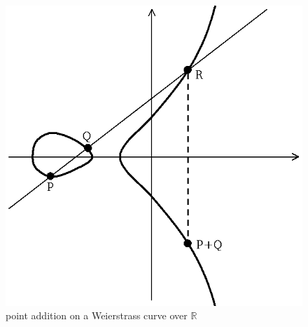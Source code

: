 \documentclass[10pt]{beamer}
\newcommand{\R}{\mathbb{R}}  %
\newcommand{\0}{\mathcal{O}}  %
\begin{document}
\begin{frame}
\begin{columns}
    \begin{column}{0.4\textwidth}
      \begin{figure}
        \centering
        \includegraphics[width=\textwidth]{ecadd}
        \caption{point addition on a Weierstrass curve over $\R$}
      \end{figure}
    \end{column}
  \end{columns}
\end{frame}

\end{document}
